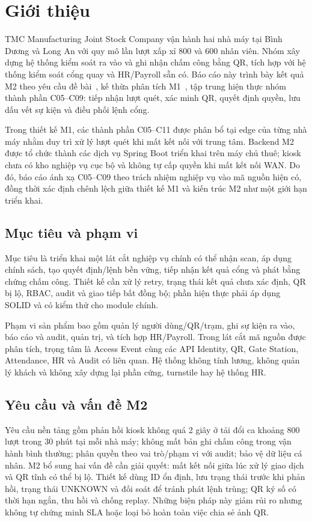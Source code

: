 ﻿\section{Giới thiệu}
\label{sec:introduction}

TMC Manufacturing Joint Stock Company vận hành hai nhà máy tại Bình Dương và Long An với quy mô lần lượt xấp xỉ 800 và 600 nhân viên. Nhóm xây dựng hệ thống kiểm soát ra vào và ghi nhận chấm công bằng QR, tích hợp với hệ thống kiểm soát cổng quay và HR/Payroll sẵn có. Báo cáo này trình bày kết quả M2 theo yêu cầu đề bài~\cite{tmc-assignment-m2}, kế thừa phân tích M1~\cite{tmc-project-m1}, tập trung hiện thực nhóm thành phần C05--C09: tiếp nhận lượt quét, xác minh QR, quyết định quyền, lưu dấu vết sự kiện và điều phối lệnh cổng.

Trong thiết kế M1, các thành phần C05--C11 được phân bổ tại edge của từng nhà máy nhằm duy trì xử lý lượt quét khi mất kết nối với trung tâm. Backend M2 được tổ chức thành các dịch vụ Spring Boot triển khai trên máy chủ thuê; kiosk chưa có kho nghiệp vụ cục bộ và không tự cấp quyền khi mất kết nối WAN. Do đó, báo cáo ánh xạ C05--C09 theo trách nhiệm nghiệp vụ vào mã nguồn hiện có, đồng thời xác định chênh lệch giữa thiết kế M1 và kiến trúc M2 như một giới hạn triển khai.

\subsection{Mục tiêu và phạm vi}
\label{subsec:objectives}
Mục tiêu là triển khai một lát cắt nghiệp vụ chính có thể nhận scan, áp dụng chính sách, tạo quyết định/lệnh bền vững, tiếp nhận kết quả cổng và phát bằng chứng chấm công. Thiết kế cần xử lý retry, trạng thái kết quả chưa xác định, QR bị lộ, RBAC, audit và giao tiếp bất đồng bộ; phần hiện thực phải áp dụng SOLID và có kiểm thử cho module chính.

Phạm vi sản phẩm bao gồm quản lý người dùng/QR/trạm, ghi sự kiện ra vào, báo cáo và audit, quản trị, và tích hợp HR/Payroll. Trong lát cắt mã nguồn được phân tích, trọng tâm là Access Event cùng các API Identity, QR, Gate Station, Attendance, HR và Audit có liên quan. Hệ thống không tính lương, không quản lý khách và không xây dựng lại phần cứng, turnstile hay hệ thống HR.

\subsection{Yêu cầu và vấn đề M2}
\label{subsec:requirements-summary}
Yêu cầu nền tảng gồm phản hồi kiosk không quá 2 giây ở tải đổi ca khoảng 800 lượt trong 30 phút tại mỗi nhà máy; không mất bản ghi chấm công trong vận hành bình thường; phân quyền theo vai trò/phạm vi với audit; bảo vệ dữ liệu cá nhân. M2 bổ sung hai vấn đề cần giải quyết: mất kết nối giữa lúc xử lý giao dịch và QR tĩnh có thể bị lộ. Thiết kế dùng ID ổn định, lưu trạng thái trước khi phản hồi, trạng thái UNKNOWN và đối soát để tránh phát lệnh trùng; QR ký số có thời hạn ngắn, thu hồi và chống replay. Những biện pháp này giảm rủi ro nhưng không tự chứng minh SLA hoặc loại bỏ hoàn toàn việc chia sẻ ảnh QR.

